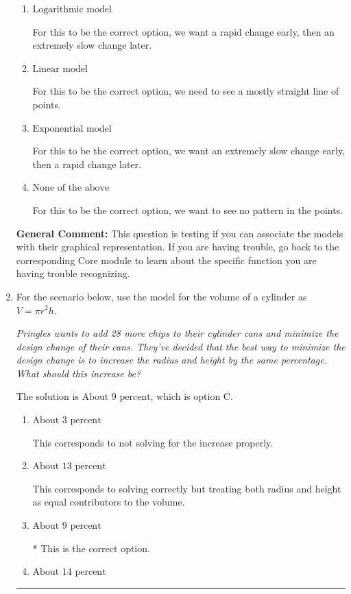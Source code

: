 \documentclass{extbook}[14pt]
\newcommand{\litem}[1]{\item #1

\rule{\textwidth}{0.4pt}}
\begin{document}
\begin{enumerate}
{\begin{enumerate}[label=\Alph*.]
For this to be the correct option, we need to see a polynomial or rational shape.
\item \( \text{Logarithmic model} \)

For this to be the correct option, we want a rapid change early, then an extremely slow change later.
\item \( \text{Linear model} \)

For this to be the correct option, we need to see a mostly straight line of points.
\item \( \text{Exponential model} \)

For this to be the correct option, we want an extremely slow change early, then a rapid change later.
\item \( \text{None of the above} \)

For this to be the correct option, we want to see no pattern in the points.
\end{enumerate}

\textbf{General Comment:} This question is testing if you can associate the models with their graphical representation. If you are having trouble, go back to the corresponding Core module to learn about the specific function you are having trouble recognizing.
}
\litem{
For the scenario below, use the model for the volume of a cylinder as $V = \pi r^2 h$.

\begin{center}
    \textit{ Pringles wants to add 28 \text{percent} more chips to their cylinder cans and minimize the design change of their cans. They've decided that the best way to minimize the design change is to increase the radius and height by the same percentage. What should this increase be? }
\end{center}
The solution is \( \text{About } 9 \text{ percent} \), which is option C.\begin{enumerate}[label=\Alph*.]
\item \( \text{About } 3 \text{ percent} \)

This corresponds to not solving for the increase properly.
\item \( \text{About } 13 \text{ percent} \)

This corresponds to solving correctly but treating both radius and height as equal contributors to the volume.
\item \( \text{About } 9 \text{ percent} \)

* This is the correct option.
\item \( \text{About } 14 \text{ percent} \)


\end{enumerate}}
\end{enumerate}
\end{document}
